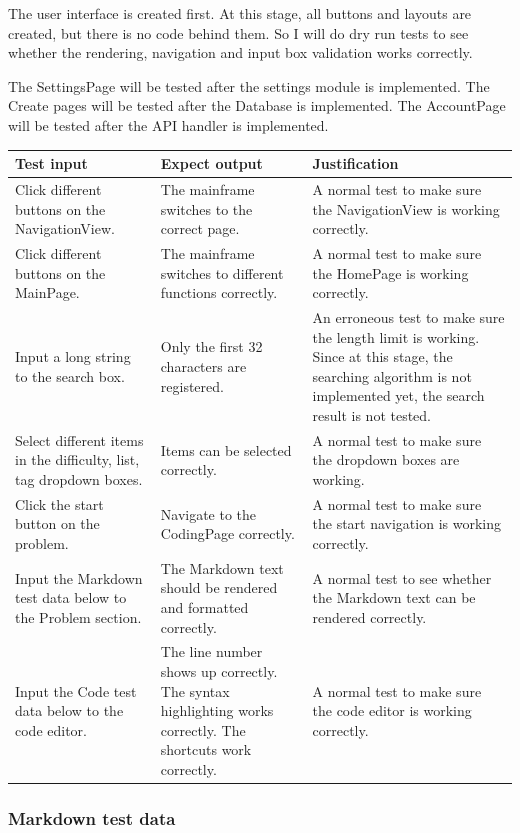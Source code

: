 \documentclass[a4paper]{report}
\begin{document}
The user interface is created first. At this stage, all buttons and layouts are created, but there is no code behind them. So I will do dry run tests to see whether the rendering, navigation and input box validation works correctly.

The SettingsPage will be tested after the settings module is implemented. The Create pages will be tested after the Database is implemented. The AccountPage will be tested after the API handler is implemented. 

\begin{tabulary}{\textwidth}{|L|L|L|}
    \hline
    Test input & Expect output & Justification \\
    \hline
    Click different buttons on the NavigationView. & The mainframe switches to the correct page. & A normal test to make sure the NavigationView is working correctly. \\
    \hline
    Click different buttons on the MainPage. & The mainframe switches to different functions correctly. & A normal test to make sure the HomePage is working correctly. \\
    \hline
    Input a long string to the search box. & Only the first 32 characters are registered. & An erroneous test to make sure the length limit is working. Since at this stage, the searching algorithm is not implemented yet, the search result is not tested. \\ 
    \hline
    Select different items in the difficulty, list, tag dropdown boxes. & Items can be selected correctly. & A normal test to make sure the dropdown boxes are working. \\
    \hline
    Click the start button on the problem. & Navigate to the CodingPage correctly. & A normal test to make sure the start navigation is working correctly. \\
    \hline
    Input the Markdown test data below to the Problem section. & The Markdown text should be rendered and formatted correctly. & A normal test to see whether the Markdown text can be rendered correctly. \\
    \hline
    Input the Code test data below to the code editor. & The line number shows up correctly. The syntax highlighting works correctly. The shortcuts work correctly. & A normal test to make sure the code editor is working correctly. \\
    \hline
\end{tabulary}

\subsubsection{Markdown test data}
\end{document}
